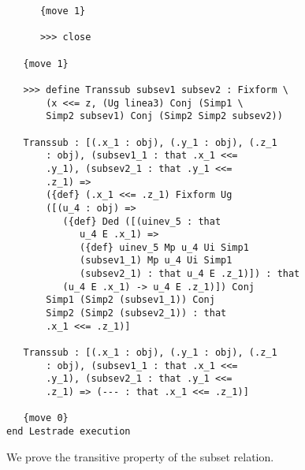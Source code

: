 \documentclass[12pt]{article}
\begin{document}
\begin{verbatim}
      {move 1}

      >>> close

   {move 1}

   >>> define Transsub subsev1 subsev2 : Fixform \
       (x <<= z, (Ug linea3) Conj (Simp1 \
       Simp2 subsev1) Conj (Simp2 Simp2 subsev2))

   Transsub : [(.x_1 : obj), (.y_1 : obj), (.z_1 
       : obj), (subsev1_1 : that .x_1 <<= 
       .y_1), (subsev2_1 : that .y_1 <<= 
       .z_1) => 
       ({def} (.x_1 <<= .z_1) Fixform Ug 
       ([(u_4 : obj) => 
          ({def} Ded ([(uinev_5 : that 
             u_4 E .x_1) => 
             ({def} uinev_5 Mp u_4 Ui Simp1 
             (subsev1_1) Mp u_4 Ui Simp1 
             (subsev2_1) : that u_4 E .z_1)]) : that 
          (u_4 E .x_1) -> u_4 E .z_1)]) Conj 
       Simp1 (Simp2 (subsev1_1)) Conj 
       Simp2 (Simp2 (subsev2_1)) : that 
       .x_1 <<= .z_1)]

   Transsub : [(.x_1 : obj), (.y_1 : obj), (.z_1 
       : obj), (subsev1_1 : that .x_1 <<= 
       .y_1), (subsev2_1 : that .y_1 <<= 
       .z_1) => (--- : that .x_1 <<= .z_1)]

   {move 0}
end Lestrade execution
\end{verbatim}

We prove the transitive property of the subset relation.
\end{document}
